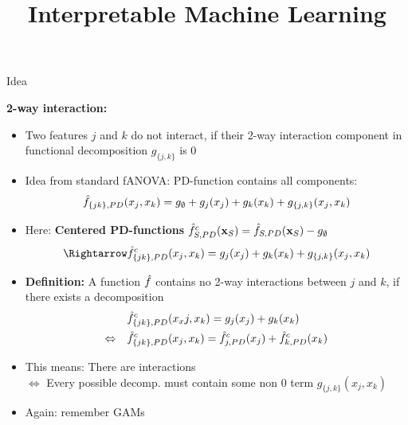 \documentclass[10pt,compress,t,notes=noshow, xcolor=table]{beamer}
\title{Interpretable Machine Learning}
\date{}
\begin{document}




\begin{frame}{Idea }

    \textbf{2-way interaction:}
    \begin{itemize}[<+->]
        \item Two features $j$ and $k$ do not interact, if their 2-way interaction component in functional decomposition $g_{\{j,k\}}$ is 0
        \item Idea from standard fANOVA: PD-function contains all components:
        $$
        \hat{f}_{\{jk\}, PD}(x_j, x_k)
        = g_\emptyset + g_j(x_j) + g_k(x_k) + g_{\{j,k\}}(x_j, x_k)
        $$
        \item Here: \textbf{Centered PD-functions} $\hat{f}_{S,PD}^c(\mathbf{x}_S) = \hat{f}_{S,PD}(\mathbf{x}_S) - g_\emptyset$
        $$
        \Rightarrow \fh^c_{\{jk\}, PD}(x_j, x_k)
        = g_j(x_j) + g_k(x_k) + g_{\{j,k\}}(x_j, x_k)
        $$
        \item \textbf{Definition:} A function $\hat{f}$ contains no 2-way interactions between $j$ and $k$, if there exists a decomposition
        \begin{align*}
            & \hat{f}_{\{jk\}, PD}^c(x_xj, x_k)
            = g_j(x_j) + g_k(x_k) \\
            \Leftrightarrow \quad
            & \hat{f}_{\{jk\}, PD}^c(x_j, x_k)
            = \hat{f}^c_{j, PD}(x_j) + \hat{f}^c_{k, PD}(x_k)
        \end{align*}
        \item This means: There are interactions \\
        $\Leftrightarrow$ Every possible decomp. must contain some non 0 term $g_{\{j,k\}}(x_j, x_k)$
        \item Again: remember GAMs
    \end{itemize}
    


\end{frame}
\end{document}

